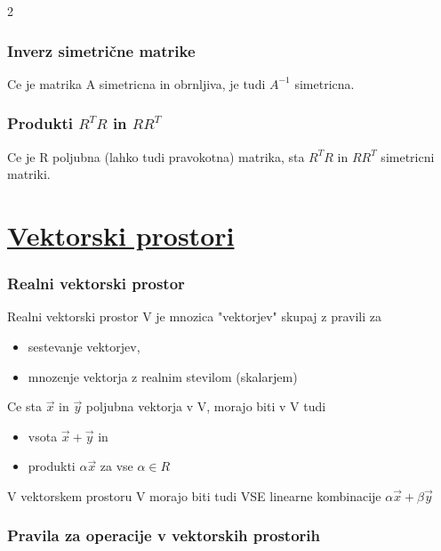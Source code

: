 \documentclass{article}
\begin{document}
\begin{multicols}{2}
	\subsubsection{Inverz simetrične matrike}

	Ce je matrika A simetricna in obrnljiva, je tudi $A^{-1}$ simetricna.

	\subsubsection{Produkti $R^{T}R$ in $RR^{T}$}

	Ce je R poljubna (lahko tudi pravokotna) matrika, sta $R^{T}R$ in
	$RR^{T}$ simetricni matriki.

	\section{\underline{Vektorski prostori}}  \label{sec:vector_spaces}

	\subsubsection{Realni vektorski prostor}

	Realni vektorski prostor V je mnozica "vektorjev" skupaj z pravili za
	\begin{itemize}
		\item sestevanje vektorjev,
		\item mnozenje vektorja z realnim stevilom (skalarjem)
	\end{itemize}
	Ce sta $\vec{x}$ in $\vec{y}$ poljubna vektorja v V, morajo biti v V tudi
	\begin{itemize}
		\item vsota $\vec{x} + \vec{y}$ in
		\item produkti $\alpha\vec{x}$ za vse $\alpha \in R$
	\end{itemize}
	V vektorskem prostoru V morajo biti tudi VSE linearne kombinacije
	$\alpha\vec{x} + \beta\vec{y}$

	\subsubsection{Pravila za operacije v vektorskih prostorih}


\end{multicols}
\end{document}
